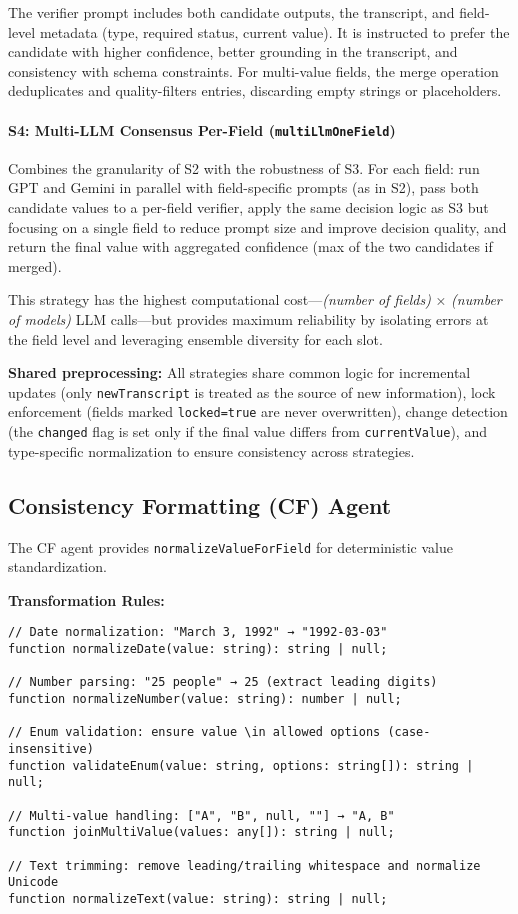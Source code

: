 The verifier prompt includes both candidate outputs, the transcript, and field-level metadata (type, required status, current value). It is instructed to prefer the candidate with higher confidence, better grounding in the transcript, and consistency with schema constraints. For multi-value fields, the merge operation deduplicates and quality-filters entries, discarding empty strings or placeholders.

\paragraph{S4: Multi-LLM Consensus Per-Field (\texttt{multiLlmOneField})}
Combines the granularity of S2 with the robustness of S3. For each field: run GPT and Gemini in parallel with field-specific prompts (as in S2), pass both candidate values to a per-field verifier, apply the same decision logic as S3 but focusing on a single field to reduce prompt size and improve decision quality, and return the final value with aggregated confidence (max of the two candidates if merged).

This strategy has the highest computational cost—\textit{(number of fields)} × \textit{(number of models)} LLM calls—but provides maximum reliability by isolating errors at the field level and leveraging ensemble diversity for each slot.

\textbf{Shared preprocessing:} All strategies share common logic for incremental updates (only \texttt{newTranscript} is treated as the source of new information), lock enforcement (fields marked \texttt{locked=true} are never overwritten), change detection (the \texttt{changed} flag is set only if the final value differs from \texttt{currentValue}), and type-specific normalization to ensure consistency across strategies.

\subsection{Consistency Formatting (CF) Agent}
\label{subsec:impl-cf}

The CF agent provides \texttt{normalizeValueForField} for deterministic value standardization.

\textbf{Transformation Rules:}
\begin{verbatim}
// Date normalization: "March 3, 1992" → "1992-03-03"
function normalizeDate(value: string): string | null;

// Number parsing: "25 people" → 25 (extract leading digits)
function normalizeNumber(value: string): number | null;

// Enum validation: ensure value \in allowed options (case-insensitive)
function validateEnum(value: string, options: string[]): string | null;

// Multi-value handling: ["A", "B", null, ""] → "A, B"
function joinMultiValue(values: any[]): string | null;

// Text trimming: remove leading/trailing whitespace and normalize Unicode
function normalizeText(value: string): string | null;
\end{verbatim}

